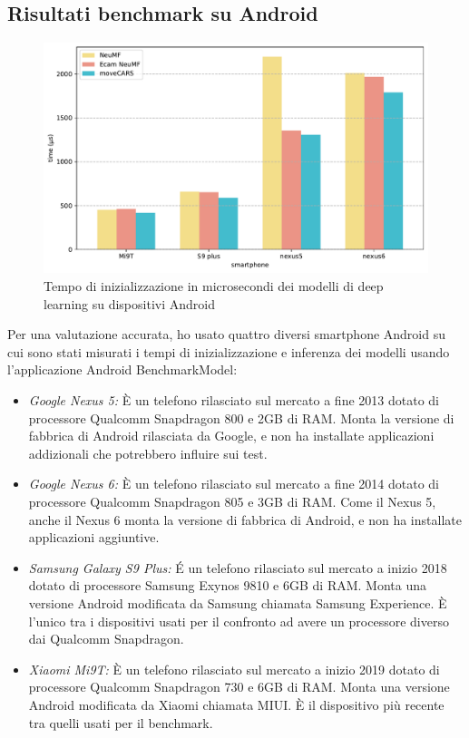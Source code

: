 \documentclass[12pt,italian]{report}
\begin{document}
\subsection{Risultati benchmark su Android}

\begin{figure}
  \centering
  \includegraphics[width=\linewidth]{immagini/init_tflite.pdf}
  \caption{Tempo di inizializzazione in microsecondi dei modelli di deep learning su dispositivi Android}
  \label{fig:init-time}
\end{figure}

\noindent Per una valutazione accurata, ho usato quattro diversi smartphone Android su cui sono stati misurati i tempi di inizializzazione e inferenza dei modelli usando l'applicazione Android BenchmarkModel:
\begin{itemize}
\item \textit{Google Nexus 5:} \`E un telefono rilasciato sul mercato a fine 2013 dotato di processore Qualcomm Snapdragon 800 e 2GB di RAM. Monta la versione di fabbrica di Android rilasciata da Google, e non ha installate applicazioni addizionali che potrebbero influire sui test.

\item \textit{Google Nexus 6:} \`E un telefono rilasciato sul mercato a fine 2014 dotato di processore Qualcomm Snapdragon 805 e 3GB di RAM. Come il Nexus 5, anche il Nexus 6 monta la versione di fabbrica di Android, e non ha installate applicazioni aggiuntive.

\item \textit{Samsung Galaxy S9 Plus:} \'E un telefono rilasciato sul mercato a inizio 2018 dotato di processore Samsung Exynos 9810 e 6GB di RAM. Monta una versione Android modificata da Samsung chiamata Samsung Experience. \`E l'unico tra i dispositivi usati per il confronto ad avere un processore diverso dai Qualcomm Snapdragon.

\item \textit{Xiaomi Mi9T:} \`E un telefono rilasciato sul mercato a inizio 2019 dotato di processore Qualcomm Snapdragon 730  e 6GB di RAM. Monta una versione Android modificata da Xiaomi chiamata MIUI. \`E il dispositivo più recente tra quelli usati per il benchmark.
\end{itemize}
\end{document}
